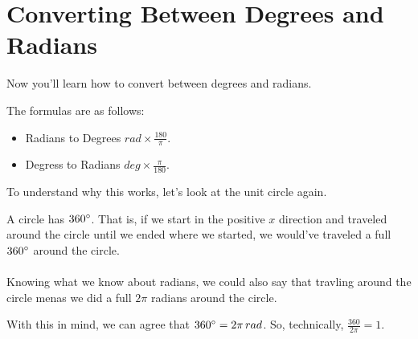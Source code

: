 \clearpage
\section{Converting Between Degrees and Radians}
Now you'll learn how to convert between degrees and radians.

The formulas are as follows:
\begin{itemize}
    \item Radians to Degrees $rad \times \frac{180}{\pi}$.
    \item Degress to Radians $deg \times \frac{\pi}{180}$.
\end{itemize}
To understand why this works, let's look at the unit circle again.
\begin{center}
    \begin{minipage}[t]{0.35\textwidth}
        \centering
    \end{minipage}%
    \begin{minipage}[t]{0.64\textwidth}
        A circle has $360 \degree$. That is, if we start in the positive $x$ direction and traveled around the circle until we ended where we started, we would've traveled a full $360\degree$ around the circle. 
        \\ \\
        Knowing what we know about radians, we could also say that travling around the circle menas we did a full $2\pi$ radians around the circle.
    \end{minipage}
\end{center}
With this in mind, we can agree that $360\degree = 2\pi\,rad$. So, technically, $\frac{360}{2\pi} = 1$.

